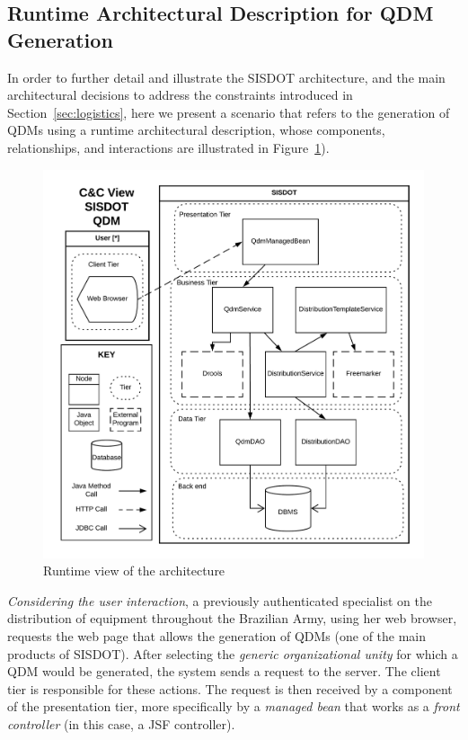 \documentclass[AMA,STIX1COL]{WileyNJD-v2}
\begin{document}
\subsection{Runtime Architectural Description for QDM Generation}

In order to further detail and illustrate the SISDOT architecture, and the main architectural decisions to address the constraints introduced in Section~\ref{sec:logistics}, here we present a scenario that refers to the generation of QDMs using a runtime architectural description, whose components, relationships, and interactions are illustrated in Figure~\ref{fig:runtime_qdm}). 

\begin{figure}[!ht] %
    \hspace*{-0.55cm}
	\includegraphics[scale=0.54]{img/runtimeView_qdm.png}
	\caption{Runtime view of the architecture} 
	\label{fig:runtime_qdm}
\end{figure}

\emph{Considering the user interaction}, a previously authenticated specialist on the distribution of equipment throughout the Brazilian Army, using her web browser, requests the web page that allows the generation of QDMs (one of the main products of SISDOT). 
After selecting the \emph{generic organizational unity} for which a QDM would be generated, the system sends a request to the server. The client tier is responsible for these actions. The request is then received by a component of the presentation tier, more specifically by a \emph{managed bean} that works as a \emph{front controller} (in this case, a JSF controller). 
\end{document}
